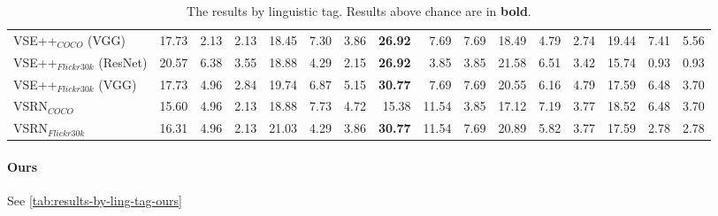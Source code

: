 \begin{table}[ht]
\begin{adjustbox}{max width=\textwidth}
\begin{tabular}{l|rrr|rrr|rrr|rrr|rrr}
 VSE++$_{COCO}$ (VGG)         & 17.73          & 2.13           & 2.13           & 18.45          & 7.30           & 3.86           & \textbf{26.92} & 7.69           & 7.69           & 18.49          & 4.79           & 2.74           & 19.44          & 7.41           & 5.56           \\
 VSE++$_{Flickr30k}$ (ResNet) & 20.57          & 6.38           & 3.55           & 18.88          & 4.29           & 2.15           & \textbf{26.92} & 3.85           & 3.85           & 21.58          & 6.51           & 3.42           & 15.74          & 0.93           & 0.93           \\
 VSE++$_{Flickr30k}$ (VGG)    & 17.73          & 4.96           & 2.84           & 19.74          & 6.87           & 5.15           & \textbf{30.77} & 7.69           & 7.69           & 20.55          & 6.16           & 4.79           & 17.59          & 6.48           & 3.70           \\
 VSRN$_{COCO}$                & 15.60          & 4.96           & 2.13           & 18.88          & 7.73           & 4.72           & 15.38          & 11.54          & 3.85           & 17.12          & 7.19           & 3.77           & 18.52          & 6.48           & 3.70           \\
 VSRN$_{Flickr30k}$           & 16.31          & 4.96           & 2.13           & 21.03          & 4.29           & 3.86           & \textbf{30.77} & 11.54          & 7.69           & 20.89          & 5.82           & 3.77           & 17.59          & 2.78           & 2.78           \\
          \bottomrule
  \end{tabular}
  \end{adjustbox}
  \caption{The results by linguistic tag. Results above chance are in \textbf{bold}.}
    \label{tab:results-by-ling-tag-baseline}
\end{table}

\paragraph{Ours}

See \cref{tab:results-by-ling-tag-ours}

